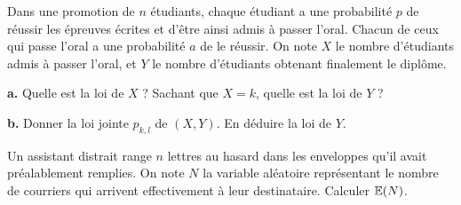 \begin{exo} Dans une promotion de $n$ étudiants, chaque étudiant a une probabilité $p$ de réussir les épreuves écrites et d'être ainsi admis à passer l'oral. Chacun de ceux qui passe l'oral a une probabilité $a$ de le réussir. On note $X$ le nombre d'étudiants admis à passer l'oral, et $Y$ le nombre d'étudiants obtenant finalement le diplôme.

\noindent\textbf{a.} Quelle est la loi de $X$ ? Sachant que $X=k$, quelle est la loi de $Y$ ?

\noindent\textbf{b.} Donner la loi jointe $p_{k,l}$ de $(X,Y)$. En déduire la loi de $Y$.
\end{exo}


\begin{exo} Un assistant distrait range $n$ lettres au hasard  dans les enveloppes qu'il avait préalablement remplies. On note $N$ la variable aléatoire représentant le nombre de courriers qui arrivent effectivement à leur destinataire.
Calculer $\mathbb E(N)$.
\end{exo}

